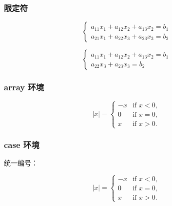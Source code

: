 \documentclass[utf-8,a4paper,11pt]{article}
\begin{document}
\subsubsection{限定符}

\begin{LTXexample}
  \begin{equation}
    \left\{
      \begin{gathered}
          a_{11} x_{1} + a_{12} x_{2} + a_{13} x_{2} = b_{1}
          \\[3pt]
          a_{21} x_{1} + a_{22} x_{3} + a_{23} x_{3} = b_{2}
      \end{gathered}
    \right.
  \end{equation}
  
  \begin{equation*}
      \left\{
        \begin{aligned}
            a_{11} x_{1} + a_{12} x_{2} + a_{13} x_{2} = b_{1}
            \\[3pt]
            a_{22} x_{3} + a_{23} x_{3} = b_{2}
        \end{aligned}
      \right.
   \end{equation*}
\end{LTXexample}

\subsubsection{array 环境}

\begin{LTXexample}
\[
  |x| = \left\{
    \begin{array}{rl}
      -x & \mbox{if } x < 0,\\ 
      0 & \mbox{if } x = 0,\\ 
      x & \mbox{if } x > 0. 
    \end{array} \right.
\]
\end{LTXexample}

\subsubsection{case 环境}

统一编号：
\begin{LTXexample}
  \begin{equation} |x| =
    \begin{cases}
        -x & \mbox{if } x < 0,\\
        0 & \mbox{if } x = 0,\\
        x & \mbox{if } x > 0.
    \end{cases}
  \end{equation}
\end{LTXexample}
\end{document}
